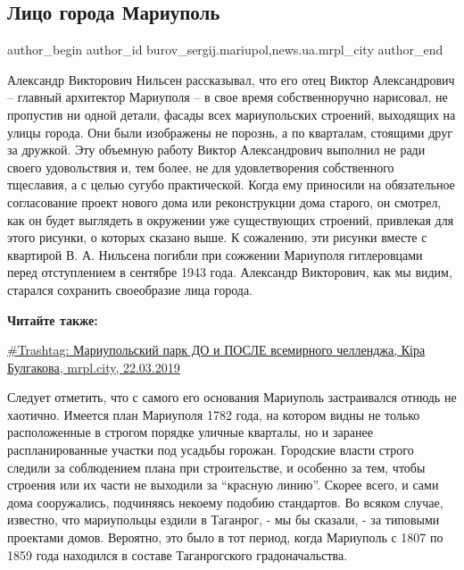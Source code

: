  
 
 
 
 
 
\subsection{Лицо города Мариуполь}
\label{sec:23_03_2019.stz.news.ua.mrpl_city.1.lico_goroda_mariupol}
 
\ifcmt
 author_begin
   author_id burov_sergij.mariupol,news.ua.mrpl_city
 author_end
\fi


Александр Викторович Нильсен рассказывал, что его отец Виктор Александрович –
главный архитектор Мариуполя – в свое время собственноручно нарисовал, не
пропустив ни одной детали, фасады всех мариупольских строений, выходящих на
улицы города. Они были изображены не порознь, а по кварталам, стоящими друг за
дружкой. Эту объемную работу Виктор Александрович выполнил не ради своего
удовольствия и, тем более, не для удовлетворения собственного тщеславия, а с
целью сугубо практической. Когда ему приносили на обязательное согласование
проект нового дома или реконструкции дома старого, он смотрел, как он будет
выглядеть в окружении уже существующих строений, привлекая для этого рисунки, о
которых сказано выше. К сожалению, эти рисунки вместе с квартирой В. А.
Нильсена погибли при сожжении Мариуполя гитлеровцами перед отступлением в
сентябре 1943 года. Александр Викторович, как мы видим, старался сохранить
своеобразие лица города.

\textbf{Читайте также:} 

\href{https://mrpl.city/news/view/trashtag-mariupolskij-park-do-i-posle-vsemirnogo-chellendzha-foto}{\#Trashtag: Мариупольский парк ДО и ПОСЛЕ всемирного челленджа, Кіра Булгакова, mrpl.city, 22.03.2019}

Следует отметить, что с самого его основания Мариуполь застраивался отнюдь не
хаотично. Имеется план Мариуполя 1782 года, на котором видны не только
расположенные в строгом порядке уличные кварталы, но и заранее распланированные
участки под усадьбы горожан. Городские власти строго следили за соблюдением
плана при строительстве, и особенно за тем, чтобы строения или их части не
выходили за \enquote{красную линию}. Скорее всего, и сами дома сооружались,
подчиняясь некоему подобию стандартов. Во всяком случае, известно, что
мариупольцы ездили в Таганрог, - мы бы сказали, - за типовыми проектами домов.
Вероятно, это было в тот период, когда Мариуполь с 1807 по 1859 года находился
в составе Таганрогского градоначальства.

